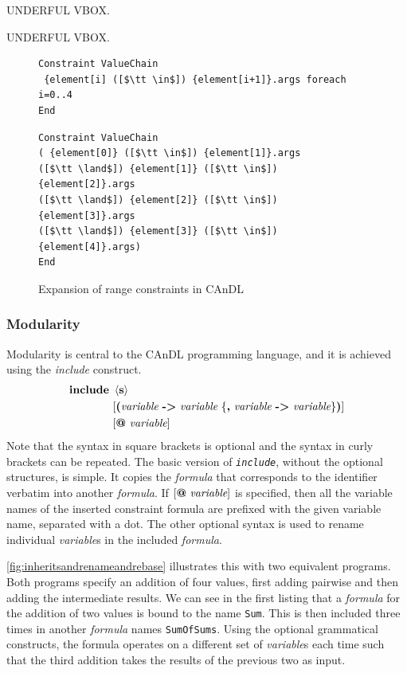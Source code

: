     UNDERFUL VBOX.

    UNDERFUL VBOX.

\begin{figure}[ht]
\begin{lstlisting}[language=CAnDL]
Constraint ValueChain
 {element[i] ([$\tt \in$]) {element[i+1]}.args foreach i=0..4
End
\end{lstlisting}
\begin{lstlisting}[language=CAnDL]
Constraint ValueChain
( {element[0]} ([$\tt \in$]) {element[1]}.args
([$\tt \land$]) {element[1]} ([$\tt \in$]) {element[2]}.args
([$\tt \land$]) {element[2]} ([$\tt \in$]) {element[3]}.args
([$\tt \land$]) {element[3]} ([$\tt \in$]) {element[4]}.args)
End
\end{lstlisting}
\vspace{-0.3cm}
\caption{Expansion of range constraints in CAnDL}
\label{fig:forall}
\end{figure}

\subsubsection{Modularity}
    \label{sec:modularity}

    Modularity is central to the CAnDL programming language, and it is achieved
    using the {\it include} construct.
    \begin{align*}
        \text{\bf include}\ &\left<\text{\bf s}\right>\\
                            &[\text{\bf (}\text{\it variable}\ \text{\bf ->}\ \text{\it variable}\ \{\text{\bf ,}\ \text{\it variable}\ \text{\bf ->}\ \text{\it variable}\}\text{\bf )}]\\
                            &[\text{\bf @}\ \text{\it variable}]
    \end{align*}
    Note that the syntax in square brackets is optional and the syntax in curly
    brackets can be repeated.
    The basic version of \texttt{\it include}, without the optional structures,
    is simple.
    It copies the {\it formula} that corresponds to the identifier verbatim into
    another {\it formula}.
    If $[\text{\bf @}\ \text{\it variable}]$ is specified, then all the variable
    names of the inserted constraint formula are prefixed with the given
    variable name, separated with a dot.
    The other optional syntax is used to rename individual {\it variable}s in
    the included {\it formula}.

    \autoref{fig:inheritsandrenameandrebase} illustrates this with two
    equivalent programs.
    Both programs specify an addition of four values, first adding pairwise and
    then adding the intermediate results.
    We can see in the first listing that a {\it formula} for the addition of two
    values is bound to the name {\tt Sum}.
    This is then included three times in another {\it formula} names
    {\tt SumOfSums}.
    Using the optional grammatical constructs, the formula operates on a
    different set of {\it variable}s each time such that the third addition
    takes the results of the previous two as input.

